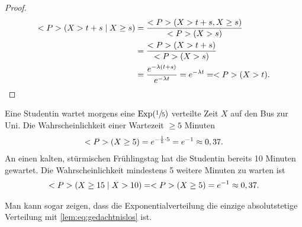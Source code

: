 \begin{proof}
	\begin{align*}
		\P(X > t+s \mid X \ge s) &= \frac{\P(X> t+s, X \ge s)}{\P(X > s)}\\
		&= \frac{\P(X > t+s)}{\P(X > s)}\\
		&= \frac{e^{-\lambda(t+s)}}{e^{-\lambda t}} = e^{-\lambda t} = \P(X> t).
	\end{align*}
\end{proof}
\begin{example}
	Eine Studentin wartet morgens eine $\EXP(\sfrac{1}{5})$ verteilte Zeit $X$ auf den Bus zur Uni. Die Wahrscheinlichkeit einer Wartezeit $\ge 5$ Minuten
	\begin{align*}
	\P(X \ge 5) = e^{-\frac{1}{5}\cdot 5} = e^{-1} \approx 0,37.
	\end{align*}
	An einen kalten, stürmischen Frühlingstag hat die Studentin bereits 10 Minuten gewartet. Die Wahrscheinlichkeit mindestens 5 weitere Minuten zu warten ist
	\begin{align*}
	\P(X\ge 15 \mid X > 10) = \P(X\ge 5) = e^{-1} \approx 0,37.
	\end{align*}
\end{example}
\begin{*hint}
	Man kann sogar zeigen, dass die Exponentialverteilung die einzige absolutstetige Verteilung mit \eqref{lem:eq:gedachtnislos} ist.
\end{*hint}

